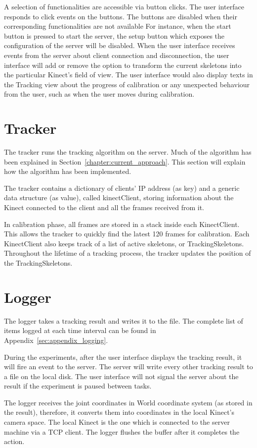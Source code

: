 A selection of functionalities are accessible via button clicks. The user interface responds to click events on the buttons. The buttons are disabled when their corresponding functionalities are not available For instance, when the start button is pressed to start the server, the setup button which exposes the configuration of the server will be disabled. When the user interface receives events from the server about client connection and disconnection, the user interface will add or remove the option to transform the current skeletons into the particular Kinect's field of view. The user interface would also display texts in the Tracking view about the progress of calibration or any unexpected behaviour from the user, such as when the user moves during calibration.

\section{Tracker}
\label{sec:implementation_tracker}

The tracker runs the tracking algorithm on the server. Much of the algorithm has been explained in Section~\ref{chapter:current_approach}. This section will explain how the algorithm has been implemented.

The tracker contains a dictionary of clients' IP address (as key) and a generic data structure (as value), called kinectClient, storing information about the Kinect connected to the client and all the frames received from it.

In calibration phase, all frames are stored in a stack inside each KinectClient. This allows the tracker to quickly find the latest 120 frames for calibration. Each KinectClient also keeps track of a list of active skeletons, or TrackingSkeletons. Throughout the lifetime of a tracking process, the tracker updates the position of the TrackingSkeletons.

\section{Logger}
\label{sec:implementation_logger}

The logger takes a tracking result and writes it to the file. The complete list of items logged at each time interval can be found in Appendix~\ref{sec:appendix_logging}.

During the experiments, after the user interface displays the tracking result, it will fire an event to the server. The server will write every other tracking result to a file on the local disk. The user interface will not signal the server about the result if the experiment is paused between tasks.

The logger receives the joint coordinates in World coordinate system (as stored in the result), therefore, it converts them into coordinates in the local Kinect's camera space. The local Kinect is the one which is connected to the server machine via a TCP client. The logger flushes the buffer after it completes the action.


